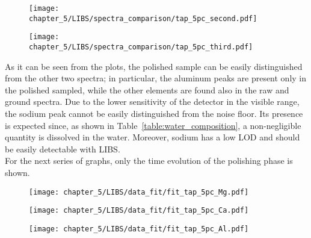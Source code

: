 \vspace*{-71pt}
\begin{figure}[H]
    \centering
    \texttt{[image: chapter\_5/LIBS/spectra\_comparison/tap\_5pc\_second.pdf]} 
 \end{figure}


\begin{figure}[H]
    \centering
    \texttt{[image: chapter\_5/LIBS/spectra\_comparison/tap\_5pc\_third.pdf]} 
 \end{figure}

 As it can be seen from the plots, the polished sample can be easily distinguished from the other two spectra; in particular, the aluminum peaks are present only in the polished sampled, while the other elements are found also in the raw and ground spectra. Due to the lower sensitivity of the detector in the visible range, the sodium peak cannot be easily distinguished from the noise floor. Its presence is expected since, as shown in Table~\ref{table:water_composition}, a non-negligible quantity is dissolved in the water. Moreover, sodium has a low LOD \cite{mansooriQuantitativeAnalysisCement2011} and should be easily detectable with LIBS.
\\
For the next series of graphs, only the time evolution of the polishing phase is shown.
\begin{figure}[H]
    \centering
    \texttt{[image: chapter\_5/LIBS/data\_fit/fit\_tap\_5pc\_Mg.pdf]} 
 \end{figure}
\vspace*{-48pt}
 \begin{figure}[H]
    \centering
    \texttt{[image: chapter\_5/LIBS/data\_fit/fit\_tap\_5pc\_Ca.pdf]} 
 \end{figure}
 \begin{figure}[H]
    \centering
    \texttt{[image: chapter\_5/LIBS/data\_fit/fit\_tap\_5pc\_Al.pdf]} 
 \end{figure}

